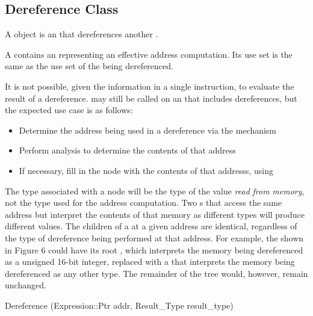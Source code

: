 \subsection{Dereference Class}
\label{sec:dereference}

A  object is an  that dereferences another .

A  contains an  representing an effective address computation. Its use set is the same as the use set of the  being dereferenced.

It is not possible, given the information in a single instruction, to evaluate the result of a dereference.  may still be called on an  that includes dereferences, but the expected use case is as follows:

\begin{itemize}
\item Determine the address being used in a dereference via the  mechanism
\item Perform analysis to determine the contents of that address
\item If necessary, fill in the  node with the contents of that addresss, using  
\end{itemize}

The type associated with a  node will be the type of the value {\itshape read\/} {\itshape from\/} {\itshape memory\/}, not the type used for the address computation. Two s that access the same address but interpret the contents of that memory as different types will produce different values. The children of a  at a given address are identical, regardless of the type of dereference being performed at that address. For example, the  shown in Figure 6 could have its root , which interprets the memory being dereferenced as a unsigned 16-\/bit integer, replaced with a  that interprets the memory being dereferenced as any other type. The remainder of the  tree would, however, remain unchanged. 

\begin{apient}
Dereference (Expression::Ptr addr, Result_Type result_type)
\end{apient}

